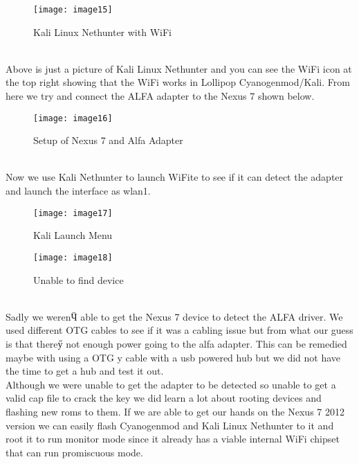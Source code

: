 \documentclass[12pt, titlepage]{article}
\begin{document}
\begin{figure}[h]
\centering
\texttt{[image: image15]}
\caption{Kali Linux Nethunter with WiFi}
\end{figure}
\\

Above is just a picture of Kali Linux Nethunter and you can see the WiFi icon at the top right showing that the WiFi works in Lollipop Cyanogenmod/Kali.  From here we try and connect the ALFA adapter to the Nexus 7 shown below.  
\\
\begin{figure}[h]
\centering
\texttt{[image: image16]}
\caption{Setup of Nexus 7 and Alfa Adapter}
\end{figure}
\\
Now we use Kali Nethunter to launch WiFite to see if it can detect the adapter and launch the interface as wlan1.
\\
\begin{figure}[h]
\centering
\texttt{[image: image17]}
\caption{Kali Launch Menu}
\end{figure}

\begin{figure}[h]
\centering
\texttt{[image: image18]}
\caption{Unable to find device}
\end{figure}
\\

Sadly we werenӴ able to get the Nexus 7 device to detect the ALFA driver.  We used different OTG cables to see if it was a cabling issue but from what our guess is that thereӳ not enough power going to the alfa adapter.  This can be remedied maybe with using a OTG y cable with a usb powered hub but we did not have the time to get a hub and test it out. 
\\
Although we were unable to get the adapter to be detected so unable to get a valid cap file to crack the key we did learn a lot about rooting devices and flashing new roms to them.  If we are able to get our hands on the Nexus 7 2012 version we can easily flash Cyanogenmod and Kali Linux Nethunter to it and root it to run monitor mode since it already has a viable internal WiFi chipset that can run promiscuous mode.  
\end{document}
